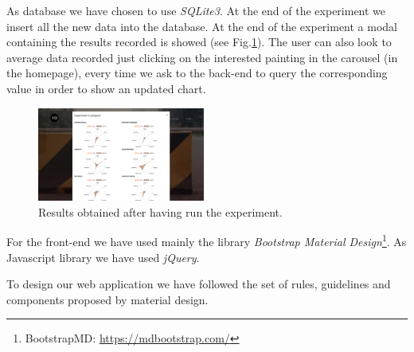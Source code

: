 \documentclass[journal, a4paper]{IEEEtran}
\begin{document}
As database we have chosen to use \textit{SQLite3}. At the end of the experiment we insert all the new data into the database. At the end of the experiment a modal containing the results recorded is showed (see Fig.\ref{fig:res}). The user can also look to average data recorded just clicking on the interested painting in the carousel (in the homepage), every time we ask to the back-end to query the corresponding value in order to show an updated chart.
\begin{figure}[h]
    \centering
    \includegraphics[width=0.49\textwidth]{results.png}
    \caption{Results obtained after having run the experiment.}
    \label{fig:res}
\end{figure}

For the front-end we have used mainly the library \textit{Bootstrap Material Design}\footnote{BootstrapMD: \url{https://mdbootstrap.com/}}. As Javascript library we have used \textit{jQuery}.

To design our web application we have followed the set of rules, guidelines and components proposed by material design.
\end{document}
